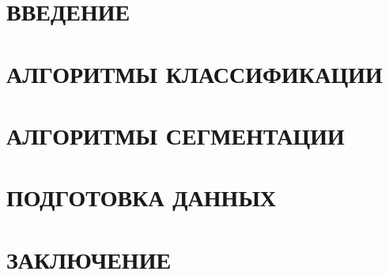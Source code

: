\documentclass[14pt,a4paper]{extreport}
\begin{document}


\newpage
\tableofcontents

\newpage
{}
\chapter*{ВВЕДЕНИЕ}


\newpage
\chapter{АЛГОРИТМЫ КЛАССИФИКАЦИИ}


\newpage
\chapter{АЛГОРИТМЫ СЕГМЕНТАЦИИ}


\newpage
\chapter{ПОДГОТОВКА ДАННЫХ}


\newpage
{}
\chapter*{ЗАКЛЮЧЕНИЕ}


\newpage
\nocite{cs231n}
\nocite{fcns_segm}
\nocite{adversarial}
\printbibliography
\end{document}
